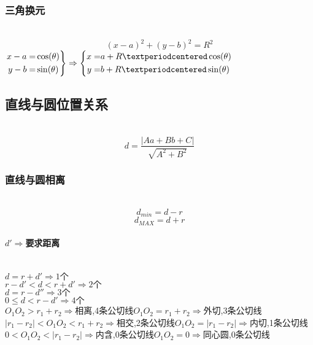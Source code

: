 \documentclass[lang=cn,10pt]{elegantbook}
\begin{document}
	\subsubsection{三角换元}~{}\\
	\[(x-a)^{2}+(y-b)^{2}=R^{2}\]
	$
	\left.
	\begin{aligned}
		x - a = & \cos(\theta) \\
		y -b = & \sin(\theta) \\
	\end{aligned}
	\right\}
	\Rightarrow
	\left\{
	\begin{aligned}
		x = & a+R\textperiodcentered \cos(\theta) \\
		y = & b+ R\textperiodcentered\sin(\theta) \\
	\end{aligned}
	\right.
	$
	
	
	\subsection{直线与圆位置关系}~{}\\
	\[d=\dfrac{|Aa+Bb+C|}{\sqrt{A^{2}+B^{2}}}\]
	\subsubsection{直线与圆相离}~{}\\ 
	\[d_{min}=d-r\]
	\[d_{MAX}=d+r\]
	\paragraph{$d'\Rightarrow$要求距离}~{}\\ 
	$d=r+d' \Rightarrow 1 \mbox{个} $\\
	$r-d'<d<r+d'\Rightarrow 2 \mbox{个}$\\
	$d=r-d''\Rightarrow 3 \mbox{个}$\\
	$0\leq d<r-d' \Rightarrow 4 \mbox{个}$\\
	
	$O_{1}O_{2}>r_{1}+r_{2} \Rightarrow$相离,4条公切线\quad $O_{1}O_{2}=r_{1}+r_{2} \Rightarrow$外切,3条公切线\\
	 $|r_{1}-r_{2}|<O_{1}O_{2}<r_{1}+r_{2} \Rightarrow$相交,2条公切线\quad $O_{1}O_{2}=|r_{1}-r_{2}| \Rightarrow$内切,1条公切线\\
     $0<O_{1}O_{2}<|r_{1}-r_{2}| \Rightarrow$内含,0条公切线\quad  $O_{1}O_{2}=0 \Rightarrow$同心圆,0条公切线\quad
\end{document}
